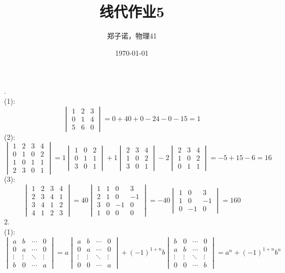 \documentclass{ctexart}
\title{线代作业5}
\author{郑子诺，物理41}
\date{\today}
\begin{document}
\maketitle
{}.\\
(1):
\[
\begin{vmatrix}
	1&2&3\\
	0&1&4\\
	5&6&0
\end{vmatrix}
=
0+40+0-24-0-15=1\]
(2):
\[\begin{vmatrix}
	1&2&3&4\\
	0&1&0&2\\
	1&0&1&1\\
	2&3&0&1
\end{vmatrix}
=1\begin{vmatrix}
	1&0&2\\
	0&1&1\\
	3&0&1
\end{vmatrix}
+1\begin{vmatrix}
	2&3&4\\
	1&0&2\\
	3&0&1
\end{vmatrix}
-2\begin{vmatrix}
	2&3&4\\
	1&0&2\\
	0&1&1
\end{vmatrix}
=-5+15-6=16\]
(3):
\[
\begin{vmatrix}
	1&2&3&4\\
	2&3&4&1\\
	3&4&1&2\\
	4&1&2&3
\end{vmatrix}
=40\begin{vmatrix}
	1&1&0&3\\
	2&1&0&-1\\
	3&0&-1&0\\
	1&0&0&0
\end{vmatrix}
=-40\begin{vmatrix}
	1&0&3\\
	1&0&-1\\
	0&-1&0
\end{vmatrix}
=160\]
2.\\
(1):\\
\[\begin{vmatrix}
a&b&\cdots&0\\
0&a&\cdots&0\\
\vdots&\vdots&\ddots&\vdots\\
b&0&\cdots&a
\end{vmatrix}
=a\begin{vmatrix}
	a&b&\cdots&0\\
	0&a&\cdots&0\\
	\vdots&\vdots&\ddots&\vdots\\
	0&0&\cdots&a
\end{vmatrix}+(-1)^{1+n}b\begin{vmatrix}
b&0&\cdots&0\\
a&b&\cdots&0\\
\vdots&\vdots&\ddots&\vdots\\
0&0&\cdots&b
\end{vmatrix}
=a^n+(-1)^{1+n}b^n\]
\end{document}
